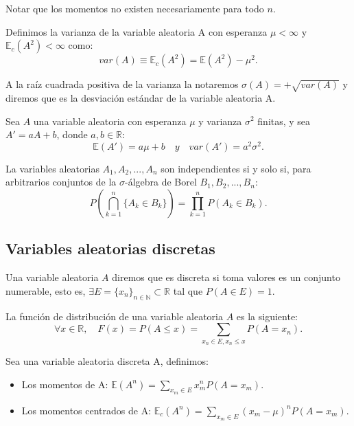 \documentclass[../proyecto.tex]{memoir}
\begin{document}
Notar que los momentos no existen necesariamente para todo $n$.

\begin{defi}
Definimos la varianza de la variable aleatoria A con esperanza $\mu < \infty$ y $\mathds{E}_c(A^2) < \infty $ como:$$
var(A) \equiv \mathds{E}_c(A^2) = \mathds{E}(A^2) - \mu^2.
$$
\end{defi}

\begin{defi}
A la raíz cuadrada positiva de la varianza la notaremos $\sigma(A)=+\sqrt{var(A)}$ y diremos que es la desviación estándar de la variable aleatoria A. 
\end{defi}

\begin{prop}
Sea $A$ una variable aleatoria con esperanza $\mu$ y varianza $\sigma^2$ finitas, y sea $A'=aA+b$, donde $a,b\in\mathds{R}$: $$
\mathds{E}(A')=a\mu + b \quad y \quad var(A') = a^2 \sigma^2.
$$

\end{prop}

\begin{defi}
La variables aleatorias $A_1, A_2,..., A_n$ son independientes si y solo si, para arbitrarios conjuntos de la $\sigma$-álgebra de Borel $B_1, B_2,..., B_n$: $$
	P \left( \bigcap_{k = 1}^{n} \{A_k \in B_k\} \right) = \prod_{k = 1}^{n} P(A_k \in B_k).
$$
\end{defi}

\subsection{Variables aleatorias discretas}

\begin{defi}
Una variable aleatoria $A$ diremos que es discreta si toma valores es un conjunto numerable, esto es, $\exists E=\{x_n\}_{n \in \mathds{N}} \subset \mathds{R}$ tal que $P(A \in E)=1$. 
\end{defi}

\begin{defi}
La función de distribución de una variable aleatoria $A$ es la siguiente: $$
\forall x\in \mathds{R}, \quad F(x) = P( A \leq x) = \sum_{x_n\in E, x_n \leq x} P(A=x_n).
$$
\end{defi}

\begin{defi}
Sea una variable aleatoria discreta A, definimos:

\begin{itemize}
\item Los momentos de A: $\mathds{E}(A^n) = \sum_{x_m \in E} x_m^n P(A=x_m)$.
\item Los momentos centrados de A: $\mathds{E}_c(A^n) =\sum_{x_m \in E} (x_m - \mu)^n P(A=x_m)$.
\end{itemize}
\end{defi}
\end{document}
